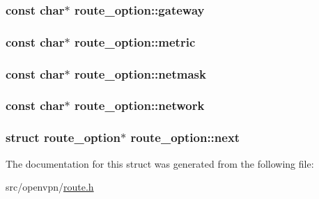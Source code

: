 \subsubsection[{gateway}]{\setlength{\rightskip}{0pt plus 5cm}const char$\ast$ route\+\_\+option\+::gateway}\label{structroute__option_a8a16bc250f76b8421ba372b9e64b07ae}
\hypertarget{structroute__option_ae4afe3a1e5520c08831cb234e4eaef03}{}
\subsubsection[{metric}]{\setlength{\rightskip}{0pt plus 5cm}const char$\ast$ route\+\_\+option\+::metric}\label{structroute__option_ae4afe3a1e5520c08831cb234e4eaef03}
\hypertarget{structroute__option_a25c5e0274ef737184473986fd12da8fd}{}
\subsubsection[{netmask}]{\setlength{\rightskip}{0pt plus 5cm}const char$\ast$ route\+\_\+option\+::netmask}\label{structroute__option_a25c5e0274ef737184473986fd12da8fd}
\hypertarget{structroute__option_a20d3cd1c7fb854bc11dc3810296da268}{}
\subsubsection[{network}]{\setlength{\rightskip}{0pt plus 5cm}const char$\ast$ route\+\_\+option\+::network}\label{structroute__option_a20d3cd1c7fb854bc11dc3810296da268}
\hypertarget{structroute__option_a59bb896ca09285be598f7b7b40268225}{}
\subsubsection[{next}]{\setlength{\rightskip}{0pt plus 5cm}struct {\bf route\+\_\+option}$\ast$ route\+\_\+option\+::next}\label{structroute__option_a59bb896ca09285be598f7b7b40268225}


The documentation for this struct was generated from the following file\+:\begin{DoxyCompactItemize}
\item 
src/openvpn/\hyperlink{route_8h}{route.\+h}\end{DoxyCompactItemize}
